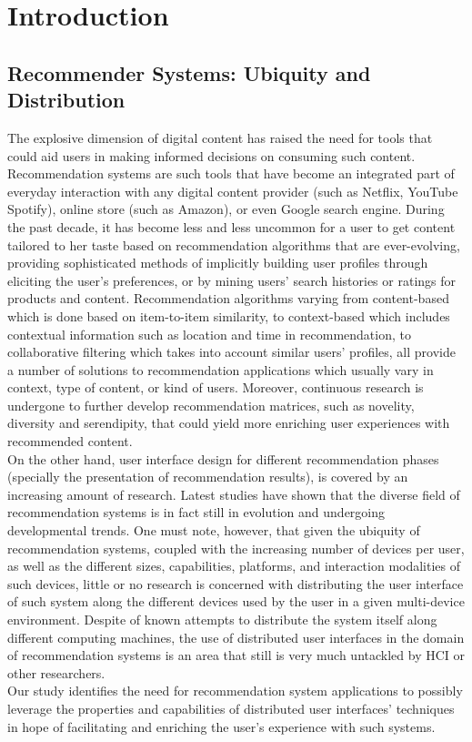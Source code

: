 \chapter{Introduction}\label{chapter:introduction}

\section{Recommender Systems: Ubiquity and Distribution}
The explosive dimension of digital content has raised the need for tools that
could aid users in making informed decisions on consuming such content.
Recommendation systems are such tools that have become an integrated part of
everyday interaction with any digital content provider (such as Netflix, YouTube
Spotify), online store (such as Amazon), or even Google search engine. During
the past decade, it has become less and less uncommon for a user to get content
tailored to her taste based on recommendation algorithms \cite{kantor2011recommender} that are
ever-evolving, providing sophisticated methods of implicitly building user profiles
through eliciting the user's preferences, or by mining users' search histories
or ratings for products and content. Recommendation algorithms varying from
content-based which is done based on item-to-item similarity, to context-based
which includes contextual information such as location and time in
recommendation, to collaborative filtering which takes into account similar
users' profiles, all provide a number of solutions to recommendation
applications which usually vary in context, type of content, or kind of users.
Moreover, continuous research is undergone to further develop recommendation
matrices, such as novelity, diversity and serendipity, that could yield more enriching user experiences with recommended content.\\
On the other hand, user interface design for different recommendation phases
(specially the presentation of recommendation results), is covered by an
increasing amount of research. Latest studies \cite{kim2015scientometric} have
shown that the diverse field of recommendation systems is in fact still in
evolution and undergoing developmental trends. One must note, however, that
given the ubiquity of recommendation systems, coupled with the increasing number of devices per user, as well as the different sizes, capabilities, platforms, and interaction modalities of such devices, little or no research is concerned with distributing the user interface of such system along the different devices used by the user in a given multi-device
environment. Despite of known attempts to distribute the system itself along
different computing machines, the use of distributed user interfaces in the
domain of recommendation systems is an area that still is very much untackled
by HCI or other researchers.\\
Our study identifies the need for recommendation system applications to possibly
leverage the properties and capabilities of distributed user interfaces'
techniques in hope of facilitating and enriching the user's experience with such systems.

